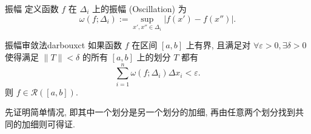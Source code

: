 \documentclass[cn,toc=twocol]{elegantbook}
\begin{document}
\begin{definition}{振幅}
	定义函数 $f$ 在 $\Delta_i$ 上的振幅 (Oscillation) 为
	\[
		\omega (f; \Delta_i) := \sup_{x',x''\in\Delta_i}\lvert f(x') - f(x'')\rvert.
	\]
\end{definition}

\begin{theorem}{振幅审敛法}{darbouxct}
	如果函数 $f$ 在区间 $[a,b]$ 上有界, 且满足对 $\forall \varepsilon > 0, \exists \delta >0$ 使得满足 $\lVert T \rVert < \delta$ 的所有 $[a,b]$ 上的划分 $T$ 都有
	\[
		\sum_{i=1}^n \omega (f ; \Delta_i) \Delta x_i < \varepsilon.
	\] 
	则 $f \in \mathscr{R}([a,b])$.
\end{theorem}
\begin{idea*}
	先证明简单情况, 即其中一个划分是另一个划分的加细, 再由任意两个划分找到共同的加细则可得证.
\end{idea*}
\end{document}
